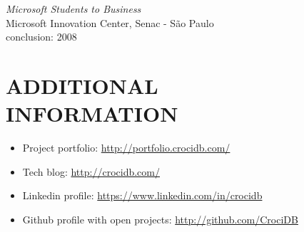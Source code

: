 \documentclass[line,margin]{res}
\begin{document}
\begin{resume}
           {\sl Microsoft Students to Business} \\
                Microsoft Innovation Center, Senac - São Paulo \\
                conclusion: 2008 

\section{ADDITIONAL \\ INFORMATION}
            \begin{itemize}  \itemsep 1pt
	    	\item Project portfolio: \href{http://portfolio.crocidb.com/}{http://portfolio.crocidb.com/}
	    	\item Tech blog: \href{http://crocidb.com/}{http://crocidb.com/}
            \item Linkedin profile: \href{https://www.linkedin.com/in/crocidb}{https://www.linkedin.com/in/crocidb}
            \item Github profile with open projects: \href{http://github.com/CrociDB}{http://github.com/CrociDB}
            \end{itemize} 

\end{resume}
\end{document}
